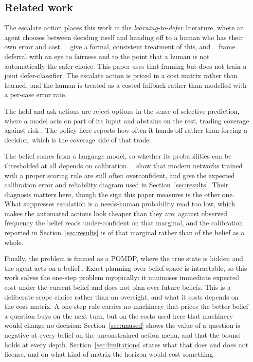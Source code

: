 \documentclass{article}
\begin{document}
\subsection{Related work}
The escalate action places this work in the \emph{learning-to-defer} literature,
where an agent chooses between deciding itself and handing off to a human who has
their own error and cost. \citeauthor{mozannar2020}~ give
a formal, consistent
treatment of this, and \citeauthor{madras2018}~ frame
deferral with an eye to fairness
and to the point that a human is not automatically the safer choice. This paper
uses that framing but does not train a joint defer-classifier. The escalate
action is priced in a cost matrix rather than learned, and the human is treated
as a costed fallback rather than modelled with a per-case error rate.

The hold and ask actions are reject options in the sense of selective
prediction, where a model acts on part of its input and abstains on the rest,
trading coverage against risk \cite{geifman2017}. The policy here reports how
often it hands off rather than forcing a decision, which is the coverage side of
that trade.

The belief comes from a language model, so whether its probabilities can be
thresholded at all depends on calibration. \citeauthor{guo2017}~
show that modern
networks trained with a proper scoring rule are still often overconfident, and
give the expected calibration error and reliability diagram used in
Section~\ref{sec:results}. Their diagnosis matters here, though the sign this paper
measures is the other one. What suppresses escalation is a needs-human probability
read too low, which makes the automated actions look cheaper than they are;
against observed frequency the belief reads under-confident on that marginal, and
the calibration reported in Section~\ref{sec:results} is of that marginal rather
than of the belief as a whole.

Finally, the problem is framed as a POMDP, where the true state is hidden and the
agent acts on a belief \cite{kaelbling1998}. Exact planning over belief space is
intractable, so this work solves the one-step problem myopically: it minimises
immediate expected cost under the current belief and does not plan over future
beliefs. This is a deliberate scope choice rather than an oversight, and what it
costs depends on the cost matrix. A one-step rule carries no machinery that prices
the better belief a question buys on the next turn, but on the costs used here
that machinery would change no decision:
Section~\ref{sec:unused} shows the value of a question is negative at every
belief on the unconstrained action menu, and that the bound holds at every depth.
Section~\ref{sec:limitations} states what that does and does not license, and on
what kind of matrix the horizon would cost something.
\end{document}
